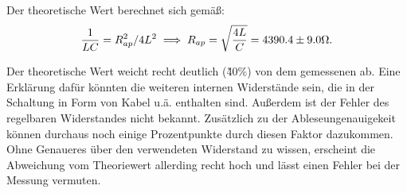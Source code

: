 Der theoretische Wert berechnet sich gemäß:
\begin{equation}
  \frac{1}{LC} = R_{ap}^2/4L^2 \\
  \implies R_{ap} = \sqrt{\frac{4L}{C}} = 4390.4 \pm 9.0\Omega.
\end{equation}

Der theoretische Wert weicht recht deutlich (\~40\%) von dem gemessenen ab.
Eine Erklärung dafür könnten die weiteren internen Widerstände sein, die in
der Schaltung in Form von Kabel u.ä. enthalten sind. Außerdem ist der Fehler
des regelbaren Widerstandes nicht bekannt. Zusätzlich zu der Ableseungenauigekeit
können durchaus noch einige Prozentpunkte durch diesen Faktor dazukommen.
Ohne Genaueres über den verwendeten Widerstand zu wissen, erscheint die
Abweichung vom Theoriewert allerding recht hoch und lässt einen Fehler
bei der Messung vermuten.

